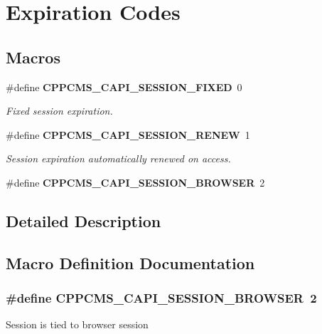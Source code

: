 \section{Expiration Codes}
\label{group__capi__session__expiration}
\subsection*{Macros}
\begin{DoxyCompactItemize}
\item 
\#define {\bf C\+P\+P\+C\+M\+S\+\_\+\+C\+A\+P\+I\+\_\+\+S\+E\+S\+S\+I\+O\+N\+\_\+\+F\+I\+X\+ED}~0\label{group__capi__session__expiration_ga452a7c3757466b1050bd27cbefacd12b}

\begin{DoxyCompactList}\small\item\em Fixed session expiration. \end{DoxyCompactList}\item 
\#define {\bf C\+P\+P\+C\+M\+S\+\_\+\+C\+A\+P\+I\+\_\+\+S\+E\+S\+S\+I\+O\+N\+\_\+\+R\+E\+N\+EW}~1\label{group__capi__session__expiration_ga4ce50c0868541dff7a93b60d8df646fd}

\begin{DoxyCompactList}\small\item\em Session expiration automatically renewed on access. \end{DoxyCompactList}\item 
\#define {\bf C\+P\+P\+C\+M\+S\+\_\+\+C\+A\+P\+I\+\_\+\+S\+E\+S\+S\+I\+O\+N\+\_\+\+B\+R\+O\+W\+S\+ER}~2
\end{DoxyCompactItemize}


\subsection{Detailed Description}


\subsection{Macro Definition Documentation}
\subsubsection[{C\+P\+P\+C\+M\+S\+\_\+\+C\+A\+P\+I\+\_\+\+S\+E\+S\+S\+I\+O\+N\+\_\+\+B\+R\+O\+W\+S\+ER}]{\setlength{\rightskip}{0pt plus 5cm}\#define C\+P\+P\+C\+M\+S\+\_\+\+C\+A\+P\+I\+\_\+\+S\+E\+S\+S\+I\+O\+N\+\_\+\+B\+R\+O\+W\+S\+ER~2}\label{group__capi__session__expiration_gaeb1bb471ebd5eb97a8e595feeed893fc}
Session is tied to browser session 